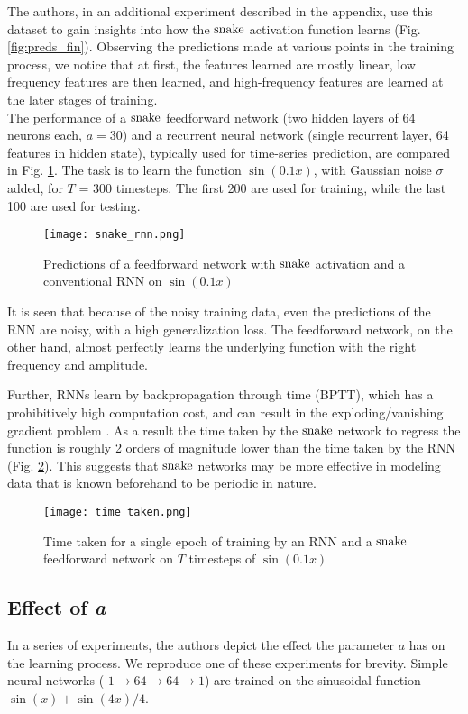 The authors, in an additional experiment described in the appendix, use this dataset to gain insights into how the $ \operatorname{snake} $ activation function learns (Fig. \ref{fig:preds_fin}).
Observing the predictions made at various points in the training process, we notice that at first, the features learned are mostly linear, low frequency features are then learned, and high-frequency features are learned at the later stages of training. \\

 The performance of a $ \operatorname{snake} $ feedforward network (two hidden layers of 64 neurons each, $a=30$) and a recurrent neural network (single recurrent layer, 64 features in hidden state), typically used for time-series prediction, are compared in Fig. \ref{fig:rnn_preds}. The task is to learn the function $\sin(0.1x)$, with Gaussian noise $\sigma$ added, for $T$ = 300 timesteps. The first 200 are used for training, while the last 100 are used for testing. 

\begin{figure}[h]
\centering
\texttt{[image: snake\_rnn.png]}
\caption{Predictions of a feedforward network with $ \operatorname{snake} $ activation and a conventional RNN on $\sin(0.1x)$}
\label{fig:rnn_preds}
\end{figure}

It is seen that because of the noisy training data, even the predictions of the RNN are noisy, with a high generalization loss. The feedforward network, on the other hand, almost perfectly learns the underlying function with the right frequency and amplitude.

Further, RNNs learn by backpropagation through time (BPTT), which has a prohibitively high computation cost, and can result in the exploding/vanishing gradient problem \cite{pascanu2013difficulty}. As a result the time taken by the $ \operatorname{snake} $ network to regress the function is roughly 2 orders of magnitude lower than the time taken by the RNN (Fig. \ref{fig:rnn_time}). This suggests that $ \operatorname{snake} $ networks may be more effective in modeling data that is known beforehand to be periodic in nature.

\begin{figure}[h]
\centering
\texttt{[image: time taken.png]}
\caption{Time taken for a single epoch of training by an RNN and a $ \operatorname{snake} $ feedforward network on $T$ timesteps of $\sin(0.1x)$}
\label{fig:rnn_time}
\end{figure}

\subsection{Effect of \textbf{\textit{a}}}
In a series of experiments, the authors depict the effect the parameter $a$ has on the learning process. We reproduce one of these experiments for brevity. Simple neural networks ( $ 1 \rightarrow 64 \rightarrow 64 \rightarrow 1 $) are trained on the sinusoidal function $\sin(x) + \sin(4x)/4$.

